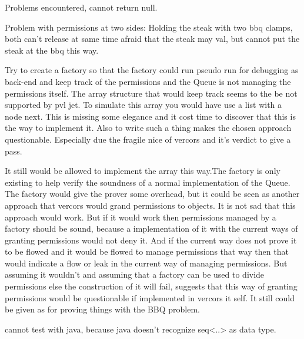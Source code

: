 
Problems encountered,
cannot return null.

Problem with permissions at two sides:
Holding the steak with two bbq clamps, both can't release at same time afraid that the steak may val, but cannot put the steak at the bbq this way.


Try to create a factory so that the factory could run pseudo run for debugging as back-end and keep track of the permissions and the Queue is not managing the permissions itself. The array structure that would keep track seems to the be not supported by pvl jet. To simulate this array you would have use a list with a node next. This is missing some elegance and it cost time to discover that this is the way to implement it. Also to write such a thing makes the chosen approach questionable. Especially due the fragile nice of vercors and it's verdict to give a pass.

It still would be allowed to implement the array this way.The factory is only existing to help verify the soundness of a normal implementation of the Queue. The factory would give the prover some overhead, but it could be seen as another approach that vercors would grand permissions to objects. It is not sad that this approach would work. But if it would work then permissions managed by a factory should be sound, because a implementation of it with the current ways of granting permissions would not deny it. And if the current way does not prove it to be flowed and it would be flowed to manage permissions that way then that would indicate a flow or leak in the current way of managing permissions. But assuming it wouldn't and assuming that a factory can be used to divide permissions else the construction of it will fail, suggests that this way of granting permissions would be questionable if implemented in vercors it self. It still could be given as for proving things with the BBQ problem.

cannot test with java, because java doesn't recognize seq<..> as data type.